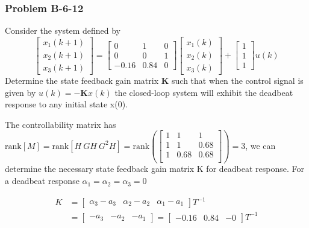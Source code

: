 \subsubsection*{Problem B-6-12}
Consider the system defined by
\[
\begin{bmatrix} x_1(k+1) \\ x_2(k+1) \\ x_3(k+1) \end{bmatrix} = 
\begin{bmatrix} 0 & 1 & 0 \\ 0 & 0 & 1 \\ -0.16 & 0.84 & 0 \end{bmatrix} 
\begin{bmatrix} x_1(k) \\ x_2(k) \\ x_3(k) \end{bmatrix} + \begin{bmatrix} 1 \\ 1 \\ 1\end{bmatrix}u(k)
\]
Determine the state feedback gain matrix $\mathbf{K}$ such that when the control signal is given by $u(k) = -\mathbf{K} x(k)$ the closed-loop system will exhibit the deadbeat response to any initial state x(0).

The controllability matrix has $\text{rank}[M]=\text{rank}[H \ GH \ G^2H]=\text{rank}\left(\begin{bmatrix} 
1 & 1    &  1     \\ 
1 & 1    &   0.68 \\ 
1 & 0.68 &   0.68 \\ \end{bmatrix}\right)=3$, we can determine the necessary state feedback gain matrix K for deadbeat response. For a deadbeat response $\alpha_1=\alpha_2= \alpha_3 =0$

\begin{align*}
 K &= \begin{bmatrix}
 \alpha_3-a_3 & \alpha_2 -a_2 & \alpha_1-a_1
\end{bmatrix}T^{-1} \\
   & = \begin{bmatrix}
   -a_3 & -a_2 & -a_1 
   \end{bmatrix} = \begin{bmatrix}
   -0.16 & 0.84 & -0 
   \end{bmatrix}T^{-1}
\end{align*}

